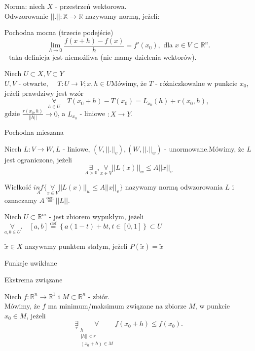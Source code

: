 \documentclass{article}
\begin{document}
\begin{definicja}Norma: niech $X$ - przestrzeń wektorowa.\\Odwzorowanie $||.||: \mathbb{X}\to \mathbb{R}$ nazywamy normą, jeżeli:\end{definicja}\begin{definicja}Pochodna mocna (trzecie podejście)\[\lim\limits_{h \to 0}\frac{f(x+h) - f(x)}{h} = f'(x_0), \text{ dla }x\in V\subset \mathbb{R}^{n}.\]- taka definicja jest niemożliwa (nie mamy dzielenia wektorów).\end{definicja}\begin{definicja}Niech $U \subset X, V\subset Y$\\$U,V\text{ - otwarte, }\quad T:U\to V; x,h\in U$Mówimy, że $T$ - różniczkowalne w punkcie $x_0$, jeżeli prawdziwy jest wzór $$\underset{h\in U}{\forall} \quad T(x_0+h) - T(x_0) = L_{x_0} (h) + r(x_0,h),$$gdzie $\frac{r(x_0,h)}{||h||}\to 0$, a $L_{x_0}$ - liniowe $: X\to Y$.\end{definicja}

\begin{definicja}Pochodna mieszana\end{definicja}

\begin{definicja}Niech $L: V\to W, L$ - liniowe, $(V,||.||_v),(W,||.||_w)$ - unormowane.Mówimy, że $L$ jest ograniczone, jeżeli$$\underset{A>0}{\exists},\underset{x\in V}{\forall} ||L(x)||_w \leq A||x||_v$$\end{definicja}\begin{definicja}Wielkość $\underset{A}{inf} \{\underset{x\in V}{\forall}||L(x)||_w \leq A||x||_v\}$ nazywamy normą odwzorowania $L$ i oznaczamy $A\overset{\text{ozn}}{=}||L||$.\end{definicja}\begin{definicja}Niech $U\subset \mathbb{R}^m$ - jest zbiorem wypukłym, jeżeli $\underset{a,b\in U}{\forall}.\quad [a,b]\overset{\text{def}}{=} \left \{ a(1-t)+bt, t\in[0,1] \right \} \subset U$\end{definicja}\begin{definicja}$\tilde x \in X$ nazywamy punktem stałym, jeżeli $P(\tilde x) = \tilde x$\end{definicja}

\begin{definicja}Funkcje uwikłane\end{definicja}
\begin{definicja}Ekstrema związane\\\end{definicja}\begin{definicja}Niech $f:\mathbb{R}^{n}\to\mathbb{R}^1$ i $M\subset \mathbb{R}^n$ - zbiór.\\Mówimy, że $f$ ma minimum/maksimum związane na zbiorze $M$, w punkcie $x_0\in M$, jeżeli\[\underset{r}{\exists} \underset{\substack{h\\  \Vert h \Vert < r \\ (x_0+h)\in M}}{\forall} f(x_0+h)\leq f(x_0).\]\end{definicja}
\end{document}
